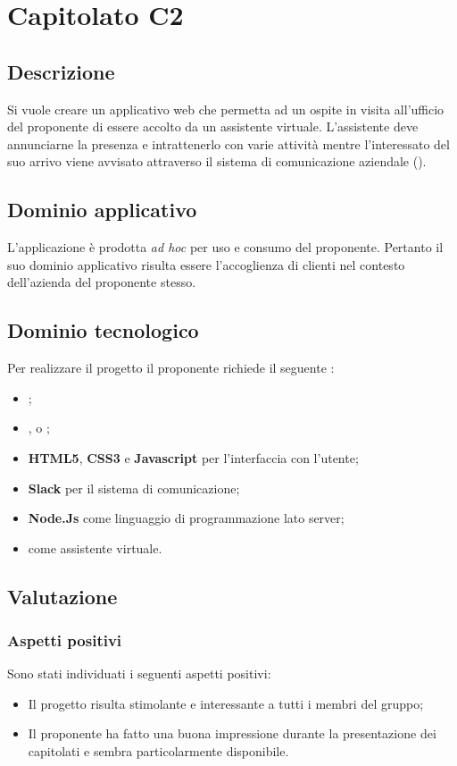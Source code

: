 \documentclass[../StudioDiFattibilita.tex]{subfiles}
\begin{document}
	\section{Capitolato C2}
		\subsection{Descrizione}
		Si vuole creare un applicativo web che permetta ad un ospite in visita all'ufficio del proponente di essere accolto da un assistente virtuale. L'assistente deve annunciarne la presenza e intrattenerlo con varie attività mentre l'interessato del suo arrivo viene avvisato attraverso il sistema di comunicazione aziendale ().
		\subsection{Dominio applicativo}
			L'applicazione è prodotta \textit{ad hoc} per uso e consumo del proponente. Pertanto il suo dominio applicativo risulta essere l'accoglienza di clienti nel contesto dell'azienda del proponente stesso.
		\subsection{Dominio tecnologico}
			Per realizzare il progetto il proponente richiede il seguente :
		\begin{itemize}
			\item \textbf{}; 
			\item \textbf{}, \textbf{} o \textbf{};
			\item \textbf{HTML5}, \textbf{CSS3} e \textbf{Javascript} per l'interfaccia con l'utente;
			\item \textbf{Slack} per il sistema di comunicazione;
			\item \textbf{Node.Js} \textbf{} come linguaggio di programmazione lato server;
			\item \textbf{} \textbf{} come assistente virtuale.
		\end{itemize}
		\subsection{Valutazione}
			\subsubsection{Aspetti positivi}
			Sono stati individuati i seguenti aspetti positivi:
			\begin{itemize}
				\item Il progetto risulta stimolante e interessante a tutti i membri del gruppo;
				\item Il proponente ha fatto una buona impressione durante la presentazione dei capitolati e sembra particolarmente disponibile.
			\end{itemize}
\end{document}
